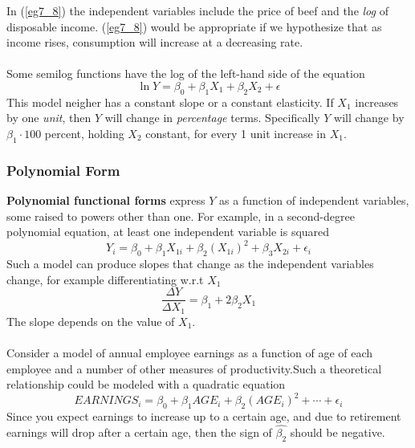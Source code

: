 \documentclass[11pt]{article}
\begin{document}
In (\ref{eg7_8}) the independent variables include the price of beef and the \textit{log} of disposable income. (\ref{eg7_8}) would be appropriate if we hypothesize that as income rises, consumption will increase at a decreasing rate. \\ \\
Some semilog functions have the log of the left-hand side of the equation
\begin{equation}
\ln Y = \beta_0 + \beta_1 X_1 + \beta_2 X_2 + \epsilon \label{eg7_9}
\end{equation}
This model neigher has a constant slope or a constant elasticity. If $X_1$ increases by one \textit{unit}, then $Y$ will change in \textit{percentage} terms. Specifically $Y$ will change by $\beta_1\cdot 100$ percent, holding $X_2$ constant, for every 1 unit increase in $X_1$.
\subsubsection{Polynomial Form}
\textbf{Polynomial functional forms} express $Y$ as a function of independent variables, some raised to powers other than one. For example, in a second-degree polynomial equation, at least one independent variable is squared
\begin{equation}
Y_i = \beta_0 + \beta_1X_{1i} + \beta_2(X_{1i})^2 + \beta_3X_{2i} + \epsilon_i \label{eg7_10}
\end{equation}
Such a model can produce slopes that change as the independent variables change, for example differentiating w.r.t $X_1$
\begin{equation}
\frac{\Delta Y}{\Delta X_1} = \beta_1 + 2\beta_2X_1 \label{eg7_11}
\end{equation}
The slope depends on the value of $X_1$. \\ \\
Consider a model of annual employee earnings as a function of age of each employee and a number of other measures of productivity.Such a theoretical relationship could be modeled with a quadratic equation
\begin{equation}
EARNINGS_i = \beta_0 + \beta_1 AGE_i + \beta_2 (AGE_i)^2 + \cdots + \epsilon_i \label{eg7_12}
\end{equation}
Since you expect earnings to increase up to a certain age, and due to retirement earnings will drop after a certain age, then the sign of $\hat{\beta_{2}}$ should be negative.
\end{document}
